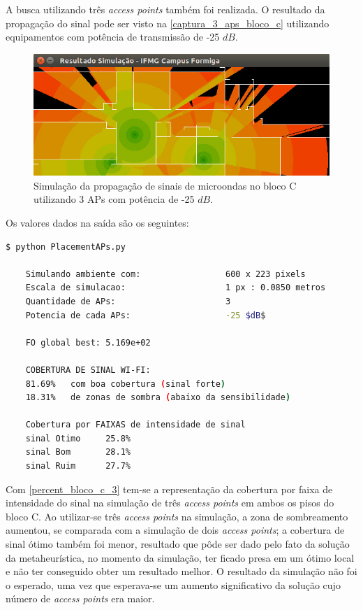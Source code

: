 \documentclass[
	12pt,				%
	twoside,			%
	a4paper,			%
	english,			%
	french,				%
	spanish,			%
	brazil				%
	]{abntex2}
\begin{document}
A busca utilizando três \emph{access points} também foi realizada. O
resultado da propagação do sinal pode ser visto na
\autoref{captura_3_aps_bloco_c} utilizando equipamentos com potência de
transmissão de -25 \(dB\).

\begin{figure}[ht]
    \caption{\label{captura_3_aps_bloco_c} Simulação da propagação de sinais de microondas no bloco C utilizando 3 APs com potência de -25 $dB$.
    }
    \begin{center}
        \includegraphics[scale=0.7]{imagens/captura-3-aps-bloco-c.jpg}
    \end{center}
\end{figure}

Os valores dados na saída são os seguintes:

\begin{lstlisting}[language=bash]
    $ python PlacementAPs.py 
    
    Simulando ambiente com:                 600 x 223 pixels
    Escala de simulacao:                    1 px : 0.0850 metros
    Quantidade de APs:                      3
    Potencia de cada APs:                   -25 $dB$
    
    FO global best: 5.169e+02
    
    COBERTURA DE SINAL WI-FI:
    81.69%   com boa cobertura (sinal forte)
    18.31%   de zonas de sombra (abaixo da sensibilidade)
    
    Cobertura por FAIXAS de intensidade de sinal
    sinal Otimo     25.8%
    sinal Bom       28.1%
    sinal Ruim      27.7%
\end{lstlisting}

Com \autoref{percent_bloco_c_3} tem-se a representação da cobertura por
faixa de intensidade do sinal na simulação de três \emph{access points}
em ambos os pisos do bloco C. Ao utilizar-se três \emph{access points}
na simulação, a zona de sombreamento aumentou, se comparada com a
simulação de dois \emph{access points}; a cobertura de sinal ótimo
também foi menor, resultado que pôde ser dado pelo fato da solução da
metaheurística, no momento da simulação, ter ficado presa em um ótimo
local e não ter conseguido obter um resultado melhor. O resultado da
simulação não foi o esperado, uma vez que esperava-se um aumento
significativo da solução cujo número de \emph{access points} era maior.
\end{document}
